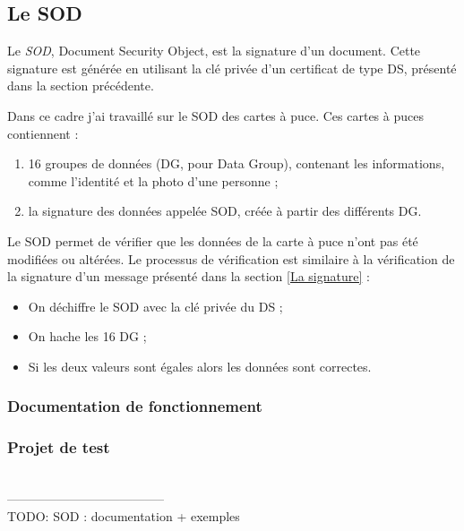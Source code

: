 
\subsection{Le SOD}

Le \textit{SOD}, Document Security Object, est la signature d'un document.
Cette signature est générée en utilisant la clé privée d'un certificat de type DS, présenté dans la section précédente.

Dans ce cadre j'ai travaillé sur le SOD des cartes à puce.
Ces cartes à puces contiennent :
\begin{enumerate}
	\item 16 groupes de données (DG, pour Data Group), contenant les informations, comme l'identité et la photo d'une personne ;
	\item la signature des données appelée SOD, créée à partir des différents DG.
\end{enumerate}

Le SOD permet de vérifier que les données de la carte à puce n'ont pas été modifiées ou altérées.
Le processus de vérification est similaire à la vérification de la signature d'un message présenté dans la section \ref{La signature} :
\begin{itemize}
	\item On déchiffre le SOD avec la clé privée du DS ;
	\item On hache les 16 DG ;
	\item Si les deux valeurs sont égales alors les données sont correctes.
\end{itemize}


\subsubsection{Documentation de fonctionnement}


\subsubsection{Projet de test}






~~\\--------------------------------------~~\\
TODO:
SOD : documentation + exemples
